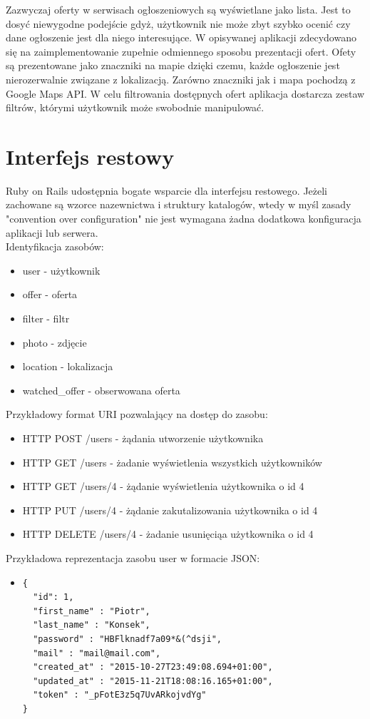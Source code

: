 Zazwyczaj oferty w serwisach ogłoszeniowych są wyświetlane jako lista. Jest to dosyć niewygodne podejście gdyż, użytkownik nie może zbyt szybko ocenić czy dane ogłoszenie jest dla niego interesujące. W opisywanej aplikacji zdecydowano się na zaimplementowanie zupełnie odmiennego sposobu prezentacji ofert. Ofety są prezentowane jako znaczniki na mapie dzięki czemu, każde ogłoszenie jest nierozerwalnie związane z lokalizacją. Zarówno znaczniki jak i mapa pochodzą z Google Maps API. W celu filtrowania dostępnych ofert aplikacja dostarcza zestaw filtrów, którymi użytkownik może swobodnie manipulować. 

\section{Interfejs restowy}
\label{sec:interfejsRestowy}
Ruby on Rails udostępnia bogate wsparcie dla interfejsu restowego. Jeżeli zachowane są wzorce nazewnictwa i struktury katalogów, wtedy w myśl zasady "convention over configuration" nie jest wymagana żadna dodatkowa konfiguracja aplikacji lub serwera.\\
Identyfikacja zasobów:
\begin{itemize}
\item user - użytkownik
\item offer - oferta
\item filter - filtr
\item photo - zdjęcie
\item location - lokalizacja
\item watched\_offer - obserwowana oferta
\end{itemize}
Przykładowy format URI pozwalający na dostęp do zasobu:
\begin{itemize}
\item HTTP POST /users - żądania utworzenie użytkownika
\item HTTP GET /users - żadanie wyświetlenia wszystkich użytkowników
\item HTTP GET /users/4 - żądanie wyświetlenia użytkownika o id 4
\item HTTP PUT /users/4 - żądanie zakutalizowania użytkownika o id 4
\item HTTP DELETE /users/4 - żadanie usunięciąa użytkownika o id 4
\end{itemize}
Przykładowa reprezentacja zasobu user w formacie JSON:
\begin{itemize}
\item \begin{lstlisting}
{
  "id": 1,
  "first_name" : "Piotr",
  "last_name" : "Konsek",
  "password" : "HBFlknadf7a09*&(^dsji",
  "mail" : "mail@mail.com",
  "created_at" : "2015-10-27T23:49:08.694+01:00",
  "updated_at" : "2015-11-21T18:08:16.165+01:00",
  "token" : "_pFotE3z5q7UvARkojvdYg"
}
\end{lstlisting}
\end{itemize}

